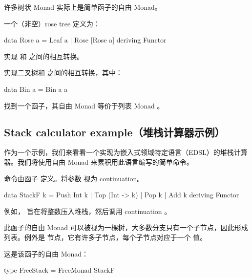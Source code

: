 \documentclass[DaoFP]{subfiles}
\begin{document}
    许多树状 Monad 实际上是简单函子的自由 Monad。

    \begin{exercise}
        一个（非空）rose tree 定义为：

        \begin{haskell}
            data Rose a = Leaf a | Rose [Rose a]
            deriving Functor
        \end{haskell}

        实现  和  之间的相互转换。
    \end{exercise}

    \begin{exercise}
        实现二叉树和  之间的相互转换，其中：

        \begin{haskell}
            data Bin a = Bin a a
        \end{haskell}
    \end{exercise}

    \begin{exercise}
        找到一个函子，其自由 Monad 等价于列表 Monad \hask{[a]}。
    \end{exercise}

    \subsection{Stack calculator example（堆栈计算器示例）}

    作为一个示例，我们来看看一个实现为嵌入式领域特定语言（EDSL）的堆栈计算器。我们将使用自由 Monad 来累积用此语言编写的简单命令。

    命令由函子  定义。将参数  视为 continuation。

    \begin{haskell}
        data StackF k  = Push Int k
        | Top (Int -> k)
        | Pop k
        | Add k
        deriving Functor
    \end{haskell}

    例如， 旨在将整数压入堆栈，然后调用 continuation 。

    此函子的自由 Monad 可以被视为一棵树，大多数分支只有一个子节点，因此形成列表。例外是  节点，它有许多子节点，每个子节点对应于一个  值。

    这是该函子的自由 Monad：

    \begin{haskell}
        type FreeStack = FreeMonad StackF
    \end{haskell}
\end{document}

